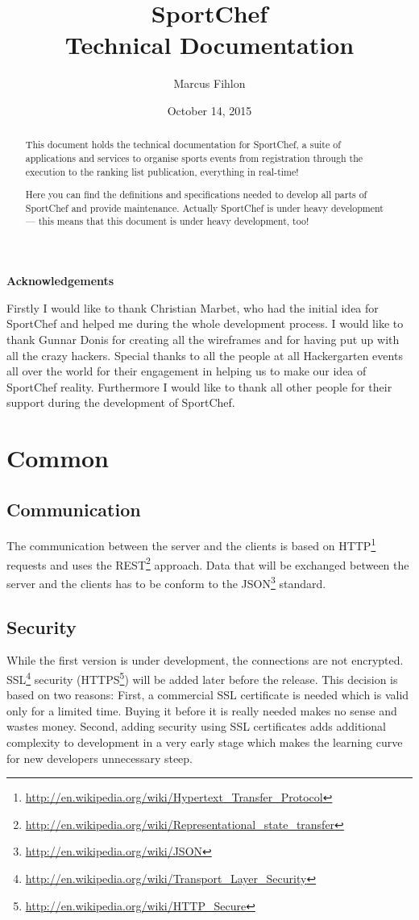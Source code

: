 \documentclass[a4paper,openright,twoside]{report}
\title{\huge SportChef \\[0.25cm] \LARGE Technical Documentation}
\author{Marcus Fihlon}
\date{October 14, 2015}
\makeatletter
\newcommand\ackname{Acknowledgements}
\newenvironment{acknowledgements}{%
      \titlepage
      \null\vfil
      \@beginparpenalty\@lowpenalty
      \begin{center}%
        \bfseries \ackname
        \@endparpenalty\@M
      \end{center}}%
     {\par\vfil\null\endtitlepage}
\newenvironment{acknowledgements}{%
      \if@twocolumn
        \section*{\abstractname}%
      \else
        \small
        \begin{center}%
          {\bfseries \ackname\vspace{-.5em}\vspace{\z@}}%
        \end{center}%
        \quotation
      \fi}
      {\if@twocolumn\else\endquotation\fi}
\makeatother
\begin{document}
\maketitle
\newpage

\begin{abstract}
This document holds the technical documentation for SportChef, a suite of applications and services to organise sports events from registration through the execution to the ranking list publication, everything in real-time!

Here you can find the definitions and specifications needed to develop all parts of SportChef and provide maintenance. Actually SportChef is under heavy development --- this means that this document is under heavy development, too!
\end{abstract}
\newpage

\begin{acknowledgements}
Firstly I would like to thank Christian Marbet, who had the initial idea for SportChef and helped me during the whole development process. I would like to thank Gunnar Donis for creating all the wireframes and for having put up with all the crazy hackers. Special thanks to all the people at all Hackergarten events all over the world for their engagement in helping us to make our idea of SportChef reality. Furthermore I would like to thank all other people for their support during the development of SportChef.
\end{acknowledgements}
\newpage

\tableofcontents
\newpage

\chapter{Common}

\section{Communication}\label{sec:Communication}
The communication between the server and the clients is based on HTTP\footnote{\url{http://en.wikipedia.org/wiki/Hypertext_Transfer_Protocol}} requests and uses the REST\footnote{\url{http://en.wikipedia.org/wiki/Representational_state_transfer}} approach. Data that will be exchanged between the server and the clients has to be conform to the JSON\footnote{\url{http://en.wikipedia.org/wiki/JSON}} standard.

\section{Security}
While the first version is under development, the connections are not encrypted. SSL\footnote{\url{http://en.wikipedia.org/wiki/Transport_Layer_Security}} security (HTTPS\footnote{\url{http://en.wikipedia.org/wiki/HTTP_Secure}}) will be added later before the release. This decision is based on two reasons: First, a commercial SSL certificate is needed which is valid only for a limited time. Buying it before it is really needed makes no sense and wastes money. Second, adding security using SSL certificates adds additional complexity to development in a very early stage which makes the learning curve for new developers unnecessary steep.
\end{document}
